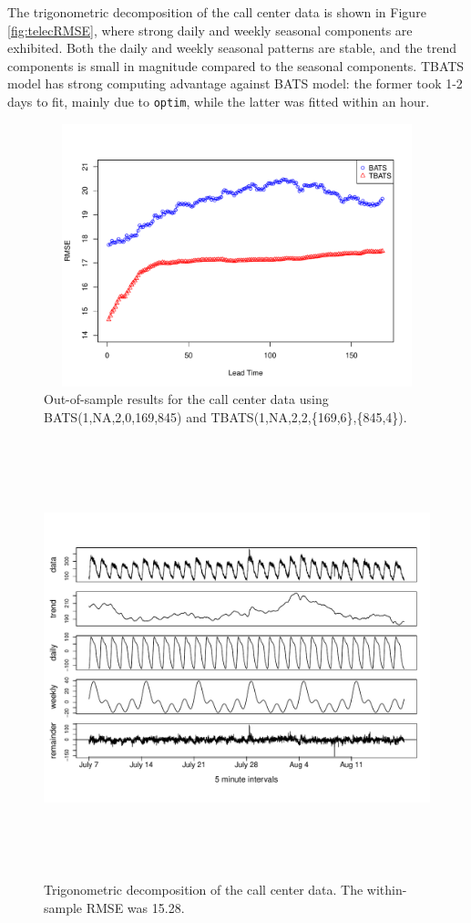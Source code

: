 \documentclass{uwstat572}
\begin{document}
The trigonometric decomposition of the call center data is shown in Figure \ref{fig:telecRMSE}, where strong daily and weekly seasonal components are exhibited. Both the daily and weekly seasonal patterns are stable, and the trend components is small in magnitude compared to the seasonal components. TBATS model has strong computing advantage against BATS model: the former took 1-2 days to fit, mainly due to \texttt{optim}, while the latter was fitted within an hour. 


\begin{figure}[]
\centering
  \includegraphics[width=6in,height=3in]{callsRMSE.pdf}
  \caption{Out-of-sample results for the call center data using BATS(1,NA,2,0,169,845) and TBATS(1,NA,2,2,\{169,6\},\{845,4\}).}
  \label{fig:callsRMSE}
\end{figure}

\begin{figure}[]
\centering
  \includegraphics[width=\linewidth,height=5in]{tbatsDecompCalls.pdf}
  \caption{Trigonometric decomposition of the call center data. The within-sample RMSE was 15.28.}
  \label{fig:tbatsDecompCalls}
\end{figure}
\end{document}
